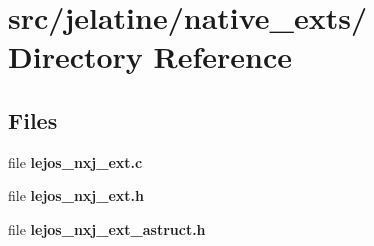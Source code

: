 \section{src/jelatine/native\_\-exts/ Directory Reference}
\label{dir_bfdb491fc48c646619dc727e5e7ba395}
\subsection*{Files}
\begin{DoxyCompactItemize}
\item 
file {\bfseries lejos\_\-nxj\_\-ext.c}
\item 
file {\bfseries lejos\_\-nxj\_\-ext.h}
\item 
file {\bfseries lejos\_\-nxj\_\-ext\_\-astruct.h}
\end{DoxyCompactItemize}
